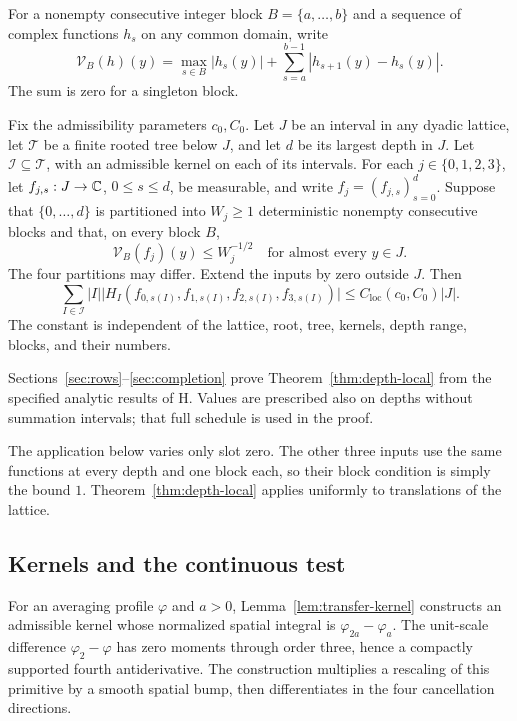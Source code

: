 For a nonempty consecutive integer block \(B=\{a,\ldots,b\}\) and a
sequence of complex functions \(h_s\) on any common domain, write
\[
 \mathcal V_B(h)(y)
   =\max_{s\in B}|h_s(y)|
       +\sum_{s=a}^{b-1}|h_{s+1}(y)-h_s(y)|.
\]
The sum is zero for a singleton block.

\begin{theorem}
\label{thm:depth-local}
Fix the admissibility parameters \(c_0,C_0\).  Let \(J\) be an interval
in any dyadic lattice, let \(\mathcal T\) be a finite rooted tree below
\(J\), and let \(d\) be its largest depth in \(J\).  Let
\(\mathcal I\subseteq\mathcal T\), with an admissible kernel on each of
its intervals.  For each \(j\in\{0,1,2,3\}\), let
\(f_{j,s}:J\to\mathbb C\), \(0\le s\le d\), be measurable, and write
\(f_j=(f_{j,s})_{s=0}^d\).  Suppose that
\(\{0,\ldots,d\}\) is partitioned into \(W_j\ge1\) deterministic nonempty
consecutive blocks and that, on every block \(B\),
\[
 \mathcal V_B(f_j)(y)\le W_j^{-1/2}
 \quad\text{for almost every }y\in J.
\]
The four partitions may differ.  Extend the inputs by zero outside \(J\).
Then
\begin{equation}
 \sum_{I\in\mathcal I}|I|
  \bigl|H_I(f_{0,s(I)},f_{1,s(I)},f_{2,s(I)},f_{3,s(I)})\bigr|
 \le C_{\mathrm{loc}}(c_0,C_0)|J|.
 \label{eq:depth-local}
\end{equation}
The constant is independent of the lattice, root, tree, kernels, depth
range, blocks, and their numbers.
\end{theorem}

Sections~\ref{sec:rows}--\ref{sec:completion} prove
Theorem~\ref{thm:depth-local} from the specified analytic results of H.
Values are prescribed also on depths
without summation intervals; that full schedule is used in the proof.

The application below varies only slot zero.  The other three inputs use
the same functions at every depth and one block each, so their block condition
is simply the bound \(1\).  Theorem~\ref{thm:depth-local} applies uniformly
to translations of the lattice.

\subsection{Kernels and the continuous test}

For an averaging profile \(\varphi\) and \(a>0\),
Lemma~\ref{lem:transfer-kernel} constructs an admissible kernel whose
normalized spatial integral is \(\varphi_{2a}-\varphi_a\).
The unit-scale difference \(\varphi_2-\varphi\) has zero moments through
order three, hence a compactly supported fourth antiderivative.  The
construction multiplies a rescaling of this primitive by a smooth spatial
bump, then differentiates in the four cancellation directions.

